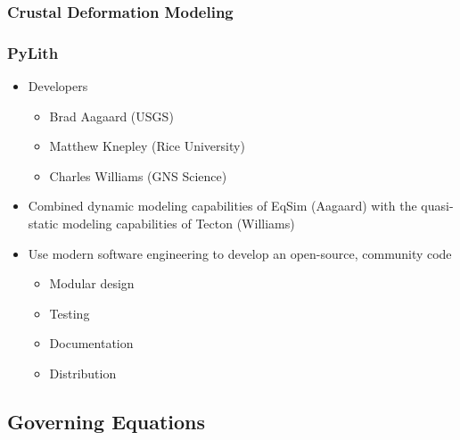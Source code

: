 \documentclass{beamer}
\begin{document}
\begin{frame}
  \frametitle{Crustal Deformation Modeling}

  
  
\end{frame}


\begin{frame}
  \frametitle{PyLith}
  \summary{}

  \begin{itemize}
  \item Developers
    \begin{itemize}
    \item Brad Aagaard (USGS)
    \item Matthew Knepley (Rice University)
    \item Charles Williams (GNS Science)
    \end{itemize}
  \item Combined dynamic modeling capabilities of EqSim (Aagaard) with
    the quasi-static modeling capabilities of Tecton (Williams)
  \item Use modern software engineering  to develop an open-source,
    community code 
    \begin{itemize}
    \item Modular design
    \item Testing
    \item Documentation
    \item Distribution
    \end{itemize}
  \end{itemize}

\end{frame}


\subsection{Governing Equations}
\end{document}
